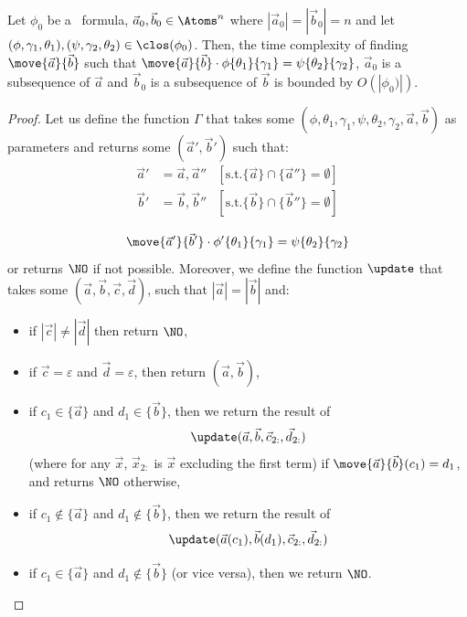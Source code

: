 \begin{lemma}\label{lem:genPartialPermF}
	Let $\phi_0$ be a \fhml\ formula, $\vec a_0, \vec b_0 \in \Atoms^{n}$ where $|\vec a_0| = |\vec b_0| = n$ and let $(\phi, \gamma_1, \theta_1), (\psi, \gamma_2, \theta_2) \in \clos(\phi_0)$.
	Then, the time complexity of finding $\move{\vec a}{\vec b}$ 
	such that $\move{\vec a}{\vec b} \cdot \phi\{\theta_1\}\{\gamma_1\} = \psi\{\theta_2\}\{\gamma_2\}$, $\vec a_0$ is a subsequence of $\vec a$ and $\vec b_0$ is a subsequence of $\vec b$ is bounded by $O(|\phi_0)|)$.
\end{lemma}

\begin{proof}
	Let us define the function $\Gamma$ that takes some $(\phi, \theta_1, \gamma_1, \psi, \theta_2, \gamma_2, \vec a, \vec b)$ as parameters and returns some $(\vec a', \vec b')$ such that:
	\[
	\begin{aligned}
		\vec a' &= \vec a, \vec a'' &[\text{s.t.} \{\vec a\} \cap \{\vec a''\} = \emptyset]\\
		\vec b' &= \vec b, \vec b'' &[\text{s.t.} \{\vec b\} \cap \{\vec b''\} = \emptyset]\\
	\end{aligned}
	\]
	\vspace{-1.5ex}
	\[
	\move{\vec a'}{\vec b'} \cdot \phi'\{\theta_1\}\{\gamma_1\} = \psi\{\theta_2\}\{\gamma_2\}
	\]
	or returns $\NO$ if not possible. 
	Moreover, we define the function $\update$ that takes some $(\vec a, \vec b, \vec c, \vec d)$, such that $|\vec a| = |\vec b|$ and:
	\begin{itemize}
		\item if $|\vec c| \neq |\vec d|$ then return $\NO$,
		\item if $\vec c = \varepsilon$ and $\vec d = \varepsilon$, then return $(\vec a, \vec b)$,
		\item if $c_1 \in \{\vec a\}$ and $d_1 \in \{\vec b\}$, then 
		we
		return the result of $$\update(\vec a, \vec b, \vec{c}_{2:}, \vec{d}_{2:})$$ (where for any $\vec x$, $\vec{x}_{2:}$ is $\vec{x}$ excluding the first term) if $\move{\vec a}{\vec b}(c_1) = d_1$, and returns $\NO$ otherwise,
		\item if $c_1 \notin \{\vec a\}$ and $d_1 \notin \{\vec b\}$, then we 
		return the result of $$\update(\vec a(c_1), \vec b(d_1), \vec{c}_{2:}, \vec{d}_{2:})$$
		\item if $c_1 \in \{\vec a\}$ and $d_1 \notin \{\vec b\}$ (or vice versa), then we return $\NO$.

\end{itemize}
\end{proof}
